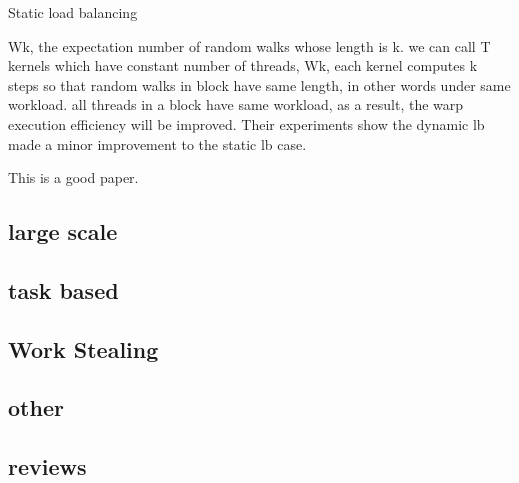 \documentclass{article}
\begin{document}
Static load balancing

Wk, the expectation number of random walks whose length is k. we can call T kernels which have constant number of threads, Wk, each kernel computes k steps so that random walks in block have same length, in other words under same workload.   
all threads in a block have same workload, as a result, the warp execution efficiency will be improved. 
Their experiments show the dynamic lb made a minor improvement to the static lb case.

This is a good paper.





\cite{dlbgraphgpu}




\subsection{large scale}

\cite{PEARCE2017}
\cite{BERLINSKA201814}
\cite{8017633}
\cite{DEVINE2005133}
\cite{javataskpool}
\cite{barat:tel-01672546}



\subsection{task based}

\cite{CPE:CPE1631}
\cite{Bhatti2017}
\cite{5599103}
\cite{Posner2018}
\cite{CCGrid2018}
\cite{8025281}
\cite{7307597}
\cite{Galvez:2017:ATM:3079079.3079104} %


\subsection{Work Stealing}
\cite{Yang2017}
\cite{Chen:2015:LWS:2775085.2766450}
\cite{Blumofe:1999:SMC:324133.324234}
\cite{Cilk}
\cite{Saraswat:2011:LGL:1941553.1941582}

\subsection{other}

\cite{Gao:2017:MPL:3110224.3110240}
\cite{CAMPOS20001213}
\cite{PINAR2004974}
\cite{7551381}
\cite{Menon:2013:DDL:2503210.2503284}
\cite{Liu:2017}
\cite{SEVERIUKHINA2017139}
\cite{7965131}


\subsection{reviews}

\cite{Teresco_2partitioning}

\printbibliography
\end{document}
